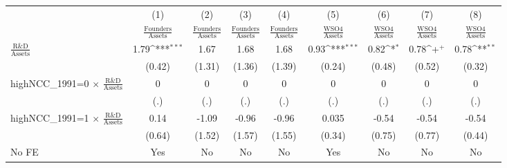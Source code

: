 {
\def\sym#1{\ifmmode^{#1}\else\(^{#1}\)\fi}
\begin{tabular}{l*{8}{c}}
\toprule
                    &\multicolumn{1}{c}{(1)}&\multicolumn{1}{c}{(2)}&\multicolumn{1}{c}{(3)}&\multicolumn{1}{c}{(4)}&\multicolumn{1}{c}{(5)}&\multicolumn{1}{c}{(6)}&\multicolumn{1}{c}{(7)}&\multicolumn{1}{c}{(8)}\\
                    &\multicolumn{1}{c}{$\frac{\textrm{Founders}}{\textrm{Assets}}$}&\multicolumn{1}{c}{$\frac{\textrm{Founders}}{\textrm{Assets}}$}&\multicolumn{1}{c}{$\frac{\textrm{Founders}}{\textrm{Assets}}$}&\multicolumn{1}{c}{$\frac{\textrm{Founders}}{\textrm{Assets}}$}&\multicolumn{1}{c}{$\frac{\textrm{WSO4}}{\textrm{Assets}}$}&\multicolumn{1}{c}{$\frac{\textrm{WSO4}}{\textrm{Assets}}$}&\multicolumn{1}{c}{$\frac{\textrm{WSO4}}{\textrm{Assets}}$}&\multicolumn{1}{c}{$\frac{\textrm{WSO4}}{\textrm{Assets}}$}\\
\midrule
$\frac{\textrm{R\&D}}{\textrm{Assets}}$&        1.79\sym{***}&        1.67         &        1.68         &        1.68         &        0.93\sym{***}&        0.82\sym{*}  &        0.78\sym{+}  &        0.78\sym{**} \\
                    &      (0.42)         &      (1.31)         &      (1.36)         &      (1.39)         &      (0.24)         &      (0.48)         &      (0.52)         &      (0.32)         \\
\addlinespace
highNCC\_1991=0 $\times$ $\frac{\textrm{R\&D}}{\textrm{Assets}}$&           0         &           0         &           0         &           0         &           0         &           0         &           0         &           0         \\
                    &         (.)         &         (.)         &         (.)         &         (.)         &         (.)         &         (.)         &         (.)         &         (.)         \\
\addlinespace
highNCC\_1991=1 $\times$ $\frac{\textrm{R\&D}}{\textrm{Assets}}$&        0.14         &       -1.09         &       -0.96         &       -0.96         &       0.035         &       -0.54         &       -0.54         &       -0.54         \\
                    &      (0.64)         &      (1.52)         &      (1.57)         &      (1.55)         &      (0.34)         &      (0.75)         &      (0.77)         &      (0.44)         \\
\addlinespace
No FE               &         Yes         &          No         &          No         &          No         &         Yes         &          No         &          No         &          No         \\

\end{tabular}}
